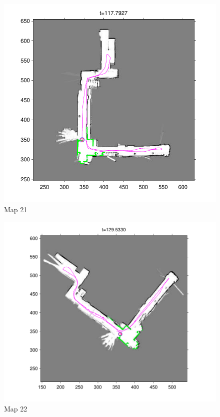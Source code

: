 \documentclass[twoside]{article}
\begin{document}
\begin{multicols}{2}
\begin{figure}[H]
\centering
\includegraphics[width=\columnwidth]{fig/map21.pdf}
\caption{Map 21}
\label{fig:map21}
\end{figure}

\begin{figure}[H]
\centering
\includegraphics[width=\columnwidth]{fig/map22.pdf}
\caption{Map 22}
\label{fig:map22}
\end{figure}


\end{multicols}
\end{document}
